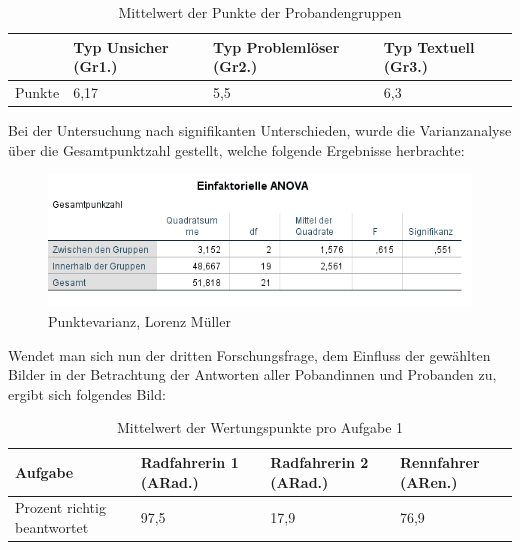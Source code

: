 \begin{table}[H]
\hspace{-5pt}
\begin{tabularx}{\textwidth + 5pt}{| @{\hspace{3pt}} M || @{\hspace{3pt}} M  | @{\hspace{3pt}} M | @{\hspace{3pt}} M |}
\hline
\textbf{ } & \textbf{Typ Unsicher (Gr1.)} & \textbf{Typ Problemlöser (Gr2.)} & \textbf{Typ Textuell (Gr3.)}\\
\hline
\hline
Punkte        & 6,17 & 5,5 & 6,3\\
\hline
\end{tabularx}
\caption{Mittelwert der Punkte der Probandengruppen}
\end{table}


Bei der Untersuchung nach signifikanten Unterschieden, wurde
die Varianzanalyse über die Gesamtpunktzahl gestellt, welche folgende Ergebnisse herbrachte:

\begin{figure}[H]
\noindent\hspace{0.5mm}\includegraphics[width=15cm]{./Ressourcen/Punktevarianz.png}
\caption{Punktevarianz, Lorenz Müller}
\end{figure}

Wendet man sich nun der dritten Forschungsfrage, dem Einfluss der gewählten Bilder in der Betrachtung der Antworten aller Pobandinnen und Probanden zu, ergibt sich folgendes Bild: 


\begin{table}[H]
\hspace{-5pt}
\begin{tabularx}{\textwidth + 5pt}{| @{\hspace{3pt}} M || @{\hspace{3pt}} M  | @{\hspace{3pt}} M | @{\hspace{3pt}} M |}
\hline
\textbf{Aufgabe} & \textbf{Radfahrerin 1 (ARad.)} & \textbf{Radfahrerin 2 (ARad.)} & \textbf{Rennfahrer (ARen.)} \\
\hline
\hline
Prozent richtig beantwortet       & 97,5 & 17,9 & 76,9 \\
\hline
\end{tabularx}
\caption{Mittelwert der Wertungspunkte pro Aufgabe 1}
\end{table}

